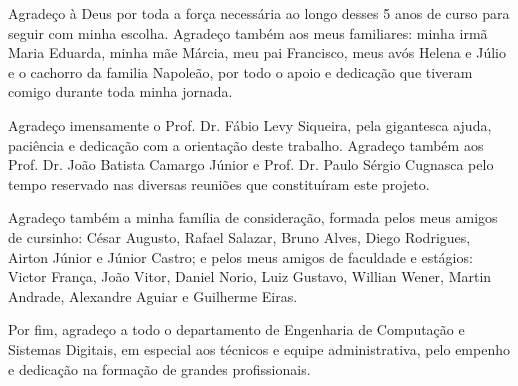 \documentclass[]{politex}
\begin{document}
\capa
\falsafolhaderosto
\folhaderosto









\begin{agradecimentos}
Agradeço à Deus por toda a força necessária ao longo desses 5 anos de curso para seguir com minha escolha. Agradeço também aos meus familiares: minha irmã Maria Eduarda, minha mãe Márcia, meu pai Francisco, meus avós Helena e Júlio e o cachorro da familia Napoleão, por todo o apoio e dedicação que tiveram comigo durante toda minha jornada.

Agradeço imensamente o Prof. Dr. Fábio Levy Siqueira, pela gigantesca ajuda, paciência e dedicação com a orientação deste trabalho. Agradeço também aos Prof. Dr. João Batista Camargo Júnior e Prof. Dr. Paulo Sérgio Cugnasca pelo tempo reservado nas diversas reuniões que constituíram este projeto.

Agradeço também a minha família de consideração, formada pelos meus amigos de cursinho: César Augusto, Rafael Salazar, Bruno Alves, Diego Rodrigues, Airton Júnior e Júnior Castro; e pelos meus amigos de faculdade e estágios: Victor França, João Vitor, Daniel Norio, Luiz Gustavo, Willian Wener, Martin Andrade, Alexandre Aguiar e Guilherme Eiras.

Por fim, agradeço a todo o departamento de Engenharia de Computação e Sistemas Digitais, em especial aos técnicos e equipe administrativa, pelo empenho e dedicação na formação de grandes profissionais.
\end{agradecimentos}


\end{document}
